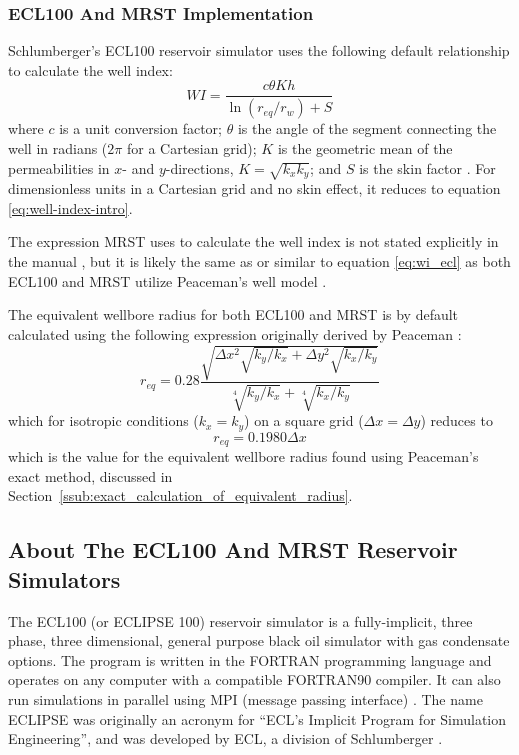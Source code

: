 \subsubsection{ECL100 And MRST Implementation} %
\label{ssub:ecl100_implementation}
Schlumberger's ECL100 reservoir simulator uses the following default relationship to calculate the well index:
\begin{equation}
    \label{eq:wi_ecl}
    WI = \frac{c\theta K h}{\ln \left(r_{eq}/r_w\right)+S}
\end{equation}
where $c$ is a unit conversion factor; $\theta$ is the angle of the segment connecting the well in radians ($2\pi$ for a Cartesian grid); $K$ is the geometric mean of the permeabilities in $x$- and $y$-directions, $K=\sqrt{k_x k_y}$; and $S$ is the skin factor \cite{Schlumberger2013Eclipse}. For dimensionless units in a Cartesian grid and no skin effect, it reduces to equation \eqref{eq:well-index-intro}.

The expression MRST uses to calculate the well index is not stated explicitly in the manual \cite{Lie2014Introduction}, but it is likely the same as or similar to equation \eqref{eq:wi_ecl} as both ECL100 and MRST utilize Peaceman's well model \cite{Lie2014Introduction}.

The equivalent wellbore radius for both ECL100 and MRST is by default calculated using the following expression \cite{Schlumberger2013Eclipse,Lie2014Introduction} originally derived by Peaceman \cite{Peaceman1983Interpretation}:
\begin{equation}
    r_{eq} = 0.28 \frac{\sqrt{\Delta x^2 \sqrt{k_y/k_x} + \Delta y^2 \sqrt{k_x/k_y}}}{\sqrt[4]{k_y/k_x}+\sqrt[4]{k_x/k_y}}
\end{equation}
which for isotropic conditions ($k_x=k_y$) on a square grid ($\Delta x= \Delta y$) reduces to
\begin{equation}
    r_{eq} = 0.1980 \Delta x
\end{equation}
which is the value for the equivalent wellbore radius found using Peaceman's exact method, discussed in Section~\ref{ssub:exact_calculation_of_equivalent_radius}.

\subsection{About The ECL100 And MRST Reservoir Simulators} %
\label{sub:about_the_ecl100_and_mrst_reservoir_simulators}
The ECL100 (or ECLIPSE 100) reservoir simulator is a fully-implicit, three phase, three dimensional, general purpose black oil simulator with gas condensate options. The program is written in the FORTRAN programming language and operates on any computer with a compatible FORTRAN90 compiler. It can also run simulations in parallel using MPI (message passing interface) \cite{Schlumberger2013Eclipse}. The name ECLIPSE was originally an acronym for ``ECL's Implicit Program for Simulation Engineering'', and was developed by ECL, a division of Schlumberger \cite{Wikipedia2014Article}.

